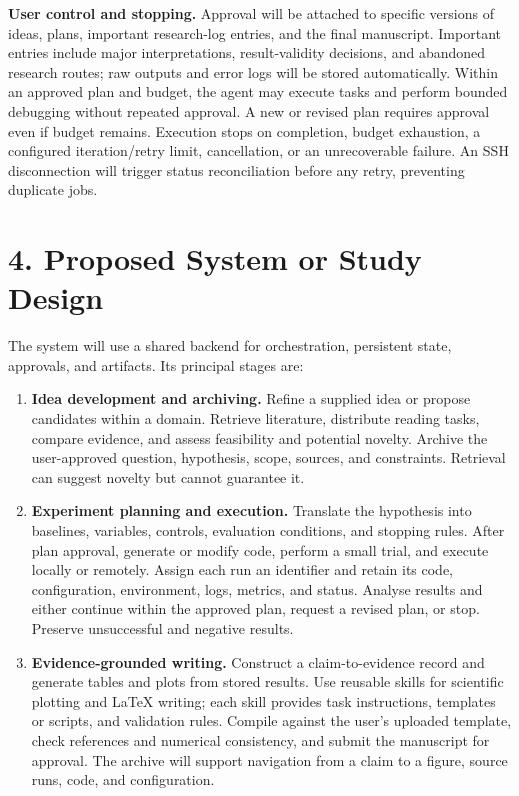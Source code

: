 \documentclass[11pt]{article}
\begin{document}
\noindent\textbf{User control and stopping.} Approval will be attached to specific versions of ideas, plans, important research-log entries, and the final manuscript. Important entries include major interpretations, result-validity decisions, and abandoned research routes; raw outputs and error logs will be stored automatically. Within an approved plan and budget, the agent may execute tasks and perform bounded debugging without repeated approval. A new or revised plan requires approval even if budget remains. Execution stops on completion, budget exhaustion, a configured iteration/retry limit, cancellation, or an unrecoverable failure. An SSH disconnection will trigger status reconciliation before any retry, preventing duplicate jobs.

\section*{4. Proposed System or Study Design}

The system will use a shared backend for orchestration, persistent state, approvals, and artifacts. Its principal stages are:

\begin{enumerate}[leftmargin=*,itemsep=0.35em]
\item \textbf{Idea development and archiving.} Refine a supplied idea or propose candidates within a domain. Retrieve literature, distribute reading tasks, compare evidence, and assess feasibility and potential novelty. Archive the user-approved question, hypothesis, scope, sources, and constraints. Retrieval can suggest novelty but cannot guarantee it.
\item \textbf{Experiment planning and execution.} Translate the hypothesis into baselines, variables, controls, evaluation conditions, and stopping rules. After plan approval, generate or modify code, perform a small trial, and execute locally or remotely. Assign each run an identifier and retain its code, configuration, environment, logs, metrics, and status. Analyse results and either continue within the approved plan, request a revised plan, or stop. Preserve unsuccessful and negative results.
\item \textbf{Evidence-grounded writing.} Construct a claim-to-evidence record and generate tables and plots from stored results. Use reusable skills for scientific plotting and LaTeX writing; each skill provides task instructions, templates or scripts, and validation rules. Compile against the user's uploaded template, check references and numerical consistency, and submit the manuscript for approval. The archive will support navigation from a claim to a figure, source runs, code, and configuration.
\end{enumerate}
\end{document}
